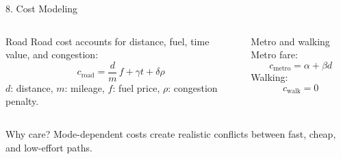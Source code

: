 \documentclass[aspectratio=169]{beamer}
\begin{document}
\begin{frame}{8. Cost Modeling}
    \begin{columns}[T]
        \begin{block}{Road}
            Road cost accounts for distance, fuel, time value, and congestion:
            \[
                c_{\text{road}} =
                \frac{d}{m}\,f + \gamma t + \delta\rho
            \]
            \scriptsize
            \(d\): distance, \(m\): mileage, \(f\): fuel price, \(\rho\): congestion penalty.
        \end{block}

        \begin{block}{Metro and walking}
            Metro fare:
            \[
                c_{\text{metro}} = \alpha + \beta d
            \]
            Walking:
            \[
                c_{\text{walk}} = 0
            \]
        \end{block}
    \end{columns}

    \begin{alertblock}{Why care?}
        Mode-dependent costs create realistic conflicts between fast, cheap, and low-effort paths.
    \end{alertblock}
\end{frame}
\end{document}
